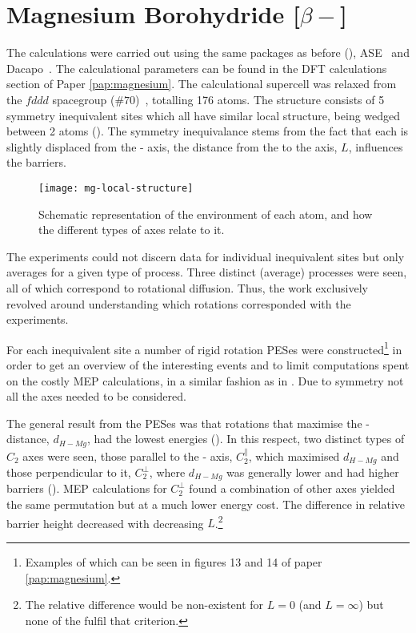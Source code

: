 \section{Magnesium Borohydride [$\beta-$]}
\label{sec:borohydrides-magnesium}
The calculations were carried out using the same packages as before (), ASE~\cite{ase-2002} and Dacapo~\cite{dacapo-1999}.
The calculational parameters can be found in the DFT calculations section of Paper \ref{pap:magnesium}.
The calculational supercell was relaxed from the $fddd$ spacegroup ($\#70$)~\cite{mgbh42-structure-fddd}, totalling 176 atoms.
The structure consists of 5 symmetry inequivalent  sites which all have similar local structure, being wedged between 2  atoms ().
The symmetry inequivalance stems from the fact that each  is slightly displaced from the - axis, the distance from the  to the axis, $L$, influences the barriers.

\begin{figure}[htb]
\begin{minipage}{1.0\textwidth}
\begin{center}
    \texttt{[image: mg-local-structure]}
    \parbox{0.85\linewidth}{
\caption{
Schematic representation of the environment of each  atom, and how the different types of axes relate to it.
}
\label{fig:mg-local-structure}
}
\end{center}
\end{minipage}
\end{figure}

The experiments could not discern data for individual inequivalent sites but only averages for a given type of process.
Three distinct (average) processes were seen, all of which correspond to rotational diffusion.
Thus, the work exclusively revolved around understanding which rotations corresponded with the experiments.

For each inequivalent site a number of rigid rotation PESes were constructed\footnote{Examples of which can be seen in figures 13 and 14 of paper \ref{pap:magnesium}.} in order to get an overview of the interesting events and to limit computations spent on the costly MEP calculations, in a similar fashion as in .
Due to symmetry not all the axes needed to be considered.

The general result from the PESes was that rotations that maximise the - distance, $d_{H-Mg}$, had the lowest energies ().
In this respect, two distinct types of $C_2$ axes were seen, those parallel to the - axis, $C_2^\parallel$, which maximised $d_{H-Mg}$ and those perpendicular to it, $C_2^\perp$, where $d_{H-Mg}$ was generally lower and had higher barriers ().
MEP calculations for $C_2^\perp$ found a combination of other axes yielded the same permutation but at a much lower energy cost.
The difference in relative barrier height decreased with decreasing $L$.\footnote{The relative difference would be non-existent for $L=0$ (and $L=\infty$) but none of the  fulfil that criterion.}


